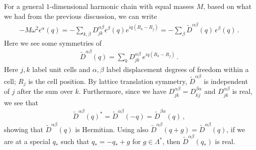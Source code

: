 \documentclass[11pt, oneside]{book}
\theoremstyle{break}
\theoremstyle{break}
\newcommand{\that}[1]{\widetilde{#1}}
\begin{document}
For a general $1$-dimensional harmonic chain  with equal masses $M$, based on what we had from the previous discussion, we can write 
\begin{align*}
-M\omega^2 \epsilon^\alpha (q) = -\sum_{k,\beta} D_{jk}^{\alpha\beta} \epsilon^\beta (q) e^{iq(R_k - R_j)} = -\sum_{\beta}\that{D}^{\alpha\beta}(q)\, \epsilon^{\beta}(q)\,.
\end{align*}
Here we see some symmetries of 
\begin{align*}
\that{D}^{\alpha\beta}(q) = \sum_k D_{jk}^{\alpha\beta}\,e^{iq(R_k - R_j)}\,.
\end{align*}
Here $j,k$ label unit cells and $\alpha,\beta$ label displacement degrees of freedom within a cell; $R_j$ is the cell position. By lattice translation symmetry, $\that{D}^{\alpha\beta}$ is independent of $j$ after the sum over $k$. Furthermore, since we have $D_{jk}^{\alpha\beta} = D_{kj}^{\beta\alpha}$ and $D_{jk}^{\alpha\beta}$ is real, we see that 
\begin{align*}
\that{D}^{\alpha\beta}(q)^* = \that{D}^{\alpha\beta}(-q) = \that{D}^{\beta\alpha}(q)\,,
\end{align*}
showing that $\that{D}^{\alpha\beta}(q)$ is Hermitian. Using also $\that{D}^{\alpha\beta}(q+g)=\that{D}^{\alpha\beta}(q)$, if we are at a special $q_*$ such that $q_* = -q_* + g$ for $g \in \Lambda^*$, then $\that{D}^{\alpha\beta}(q_*)$ is real.
\end{document}
